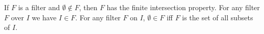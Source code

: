 If $F$ is a filter and $\emptyset \notin F$, then $F$ has the finite intersection property. For any filter $F$ over $I$ we have $I \in F$. For any filter $F$ on $I$, $\emptyset \in F$ iff $F$ is the set of all subsets of $I$.
